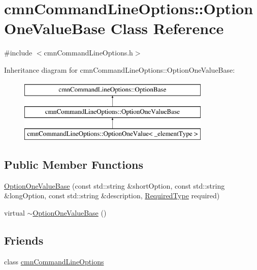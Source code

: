 \hypertarget{classcmn_command_line_options_1_1_option_one_value_base}{\section{cmn\-Command\-Line\-Options\-:\-:Option\-One\-Value\-Base Class Reference}
\label{classcmn_command_line_options_1_1_option_one_value_base}
}


{\ttfamily \#include $<$cmn\-Command\-Line\-Options.\-h$>$}

Inheritance diagram for cmn\-Command\-Line\-Options\-:\-:Option\-One\-Value\-Base\-:\begin{figure}[H]
\begin{center}
\leavevmode
\includegraphics[height=3.000000cm]{da/dde/classcmn_command_line_options_1_1_option_one_value_base}
\end{center}
\end{figure}
\subsection*{Public Member Functions}
\begin{DoxyCompactItemize}
\item 
\hyperlink{classcmn_command_line_options_1_1_option_one_value_base_a420e8ef264723125fe3cc75fc13dbc57}{Option\-One\-Value\-Base} (const std\-::string \&short\-Option, const std\-::string \&long\-Option, const std\-::string \&description, \hyperlink{classcmn_command_line_options_ac239a3ca62dd4e3b391824f6f1a97c76}{Required\-Type} required)
\item 
virtual \hyperlink{classcmn_command_line_options_1_1_option_one_value_base_a15fa4e68a55b12567ed5ad51a4bd1161}{$\sim$\-Option\-One\-Value\-Base} ()
\end{DoxyCompactItemize}
\subsection*{Friends}
\begin{DoxyCompactItemize}
\item 
class \hyperlink{classcmn_command_line_options_1_1_option_one_value_base_a18923f23ed3914806f1edf878a64b422}{cmn\-Command\-Line\-Options}
\end{DoxyCompactItemize}

